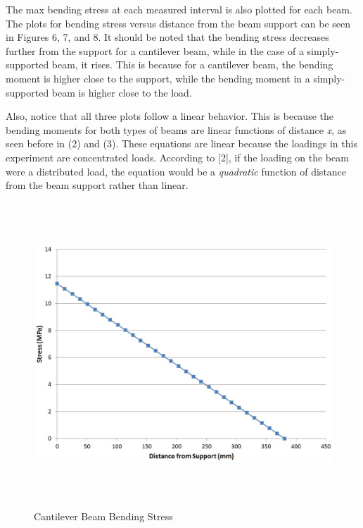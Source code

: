 \documentclass[12pt]{article}
\begin{document}
The max bending stress at each measured interval is also plotted for each beam. The plots for bending stress versus distance from the beam support can be seen in Figures 6, 7, and 8. It should be noted that the bending stress decreases further from the support for a cantilever beam, while in the case of a simply-supported beam, it rises. This is because for a cantilever beam, the bending moment is higher close to the support, while the bending moment in a simply-supported beam is higher close to the load.
\bigskip

Also, notice that all three plots follow a linear behavior. This is because the bending moments for both types of beams are linear functions of distance \emph{x}, as seen before in (2) and (3). These equations are linear because the loadings in this experiment are concentrated loads. According to [2], if the loading on the beam were a distributed load, the equation would be a \emph{quadratic} function of distance from the beam support rather than linear.
\bigskip
\bigskip
\bigskip


\begin{figure}[h!]  
  \centering
    \includegraphics[width=\linewidth, height=4.5in]{cantilever_stress_vs_distance.JPG}
    \caption{Cantilever Beam Bending Stress} 
\end{figure}


\newpage
\end{document}
